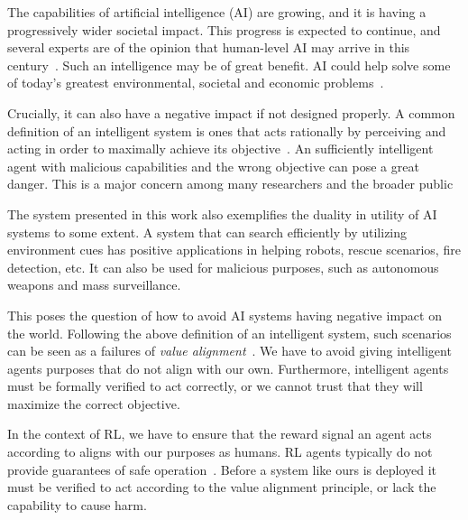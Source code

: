 The capabilities of artificial intelligence (AI) are growing, and it is having a progressively wider societal impact.
This progress is expected to continue, and several experts are of the opinion that human-level AI may arrive in this century~\cite{russell_provably_2022}.
Such an intelligence may be of great benefit.
AI could help solve some of today's greatest environmental, societal and economic problems~\cite{vinuesa_role_2020}.

Crucially, it can also have a negative impact if not designed properly.
A common definition of an intelligent system is ones that acts rationally by perceiving and acting in order to maximally achieve its objective~\cite{russell_provably_2022}.
An sufficiently intelligent agent with malicious capabilities and the wrong objective can pose a great danger.
This is a major concern among many researchers and the broader public~\cite{russell_research_2015,brundage_malicious_2018,vinuesa_role_2020,russell_provably_2022}

The system presented in this work also exemplifies the duality in utility of AI systems to some extent.
A system that can search efficiently by utilizing environment cues has positive applications in helping robots, rescue scenarios, fire detection, etc.
It can also be used for malicious purposes, such as autonomous weapons and mass surveillance.

This poses the question of how to avoid AI systems having negative impact on the world.
Following the above definition of an intelligent system, such scenarios can be seen as a failures of \textit{value alignment}~\cite{russell_provably_2022}.
We have to avoid giving intelligent agents purposes that do not align with our own.
Furthermore, intelligent agents must be formally verified to act correctly, or we cannot trust that they will maximize the correct objective.

In the context of RL, we have to ensure that the reward signal an agent acts according to aligns with our purposes as humans.
RL agents typically do not provide guarantees of safe operation~\cite{fulton_safe_2018}.
Before a system like ours is deployed it must be verified to act according to the value alignment principle, or lack the capability to cause harm.

